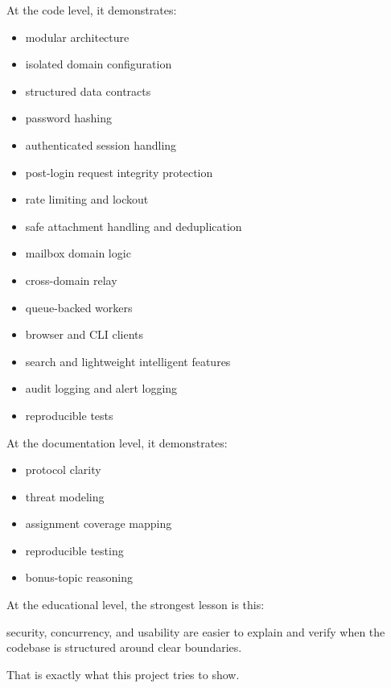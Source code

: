 \documentclass[11pt,a4paper]{article}
\begin{document}
At the code level, it demonstrates:

\begin{itemize}
\item modular architecture
\item isolated domain configuration
\item structured data contracts
\item password hashing
\item authenticated session handling
\item post-login request integrity protection
\item rate limiting and lockout
\item safe attachment handling and deduplication
\item mailbox domain logic
\item cross-domain relay
\item queue-backed workers
\item browser and CLI clients
\item search and lightweight intelligent features
\item audit logging and alert logging
\item reproducible tests
\end{itemize}

At the documentation level, it demonstrates:

\begin{itemize}
\item protocol clarity
\item threat modeling
\item assignment coverage mapping
\item reproducible testing
\item bonus-topic reasoning
\end{itemize}

At the educational level, the strongest lesson is this:

security, concurrency, and usability are easier to explain and verify when the codebase is structured around clear boundaries.

That is exactly what this project tries to show.
\end{document}
